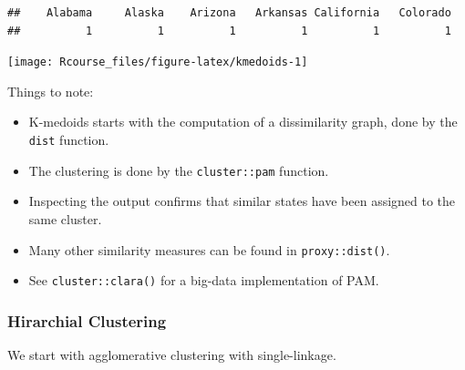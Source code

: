 \documentclass[]{book}
\newenvironment{Shaded}{\begin{snugshade}}{\end{snugshade}}
\newcommand{\KeywordTok}[1]{\textcolor[rgb]{0.13,0.29,0.53}{\textbf{{#1}}}}
\newcommand{\DataTypeTok}[1]{\textcolor[rgb]{0.13,0.29,0.53}{{#1}}}
\newcommand{\DecValTok}[1]{\textcolor[rgb]{0.00,0.00,0.81}{{#1}}}
\newcommand{\FloatTok}[1]{\textcolor[rgb]{0.00,0.00,0.81}{{#1}}}
\newcommand{\StringTok}[1]{\textcolor[rgb]{0.31,0.60,0.02}{{#1}}}
\newcommand{\NormalTok}[1]{{#1}}
\providecommand{\tightlist}{%
  \setlength{\itemsep}{0pt}\setlength{\parskip}{0pt}}
\theoremstyle{definition}
\theoremstyle{definition}
\theoremstyle{remark}
\begin{document}
\begin{verbatim}
##    Alabama     Alaska    Arizona   Arkansas California   Colorado 
##          1          1          1          1          1          1
\end{verbatim}

\begin{Shaded}
\end{Shaded}

\texttt{[image: Rcourse\_files/figure-latex/kmedoids-1]}

Things to note:

\begin{itemize}
\tightlist
\item
  K-medoids starts with the computation of a dissimilarity graph, done
  by the \texttt{dist} function.
\item
  The clustering is done by the \texttt{cluster::pam} function.
\item
  Inspecting the output confirms that similar states have been assigned
  to the same cluster.
\item
  Many other similarity measures can be found in \texttt{proxy::dist()}.
\item
  See \texttt{cluster::clara()} for a big-data implementation of PAM.
\end{itemize}

\subsubsection{Hirarchial Clustering}\label{hirarchial-clustering-1}

We start with agglomerative clustering with single-linkage.
\end{document}
